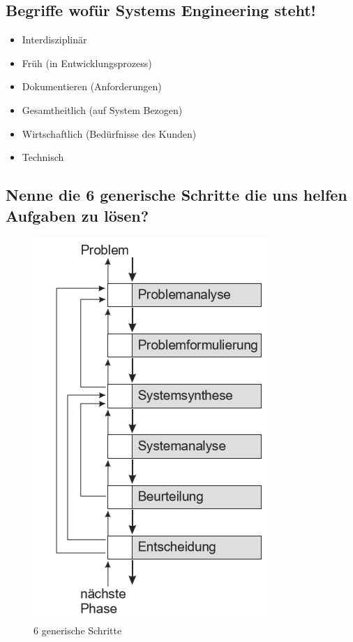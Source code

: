 \subsection{Begriffe wofür Systems Engineering steht!}
\begin{itemize}[itemsep=0pt, topsep=10pt]
    \item Interdisziplinär
    \item Früh (in Entwicklungsprozess)
    \item Dokumentieren (Anforderungen)
    \item Gesamtheitlich (auf System Bezogen)
    \item Wirtschaftlich (Bedürfnisse des Kunden)
    \item Technisch
\end{itemize}


\subsection{\color{red}Nenne die 6 generische Schritte die uns helfen Aufgaben zu lösen?}

\begin{figure}[H]
	\centering
	\includegraphics[width=0.4\linewidth]{Bilder/Teil1_6Schritte.png}
	\caption{6 generische Schritte}
\end{figure}

